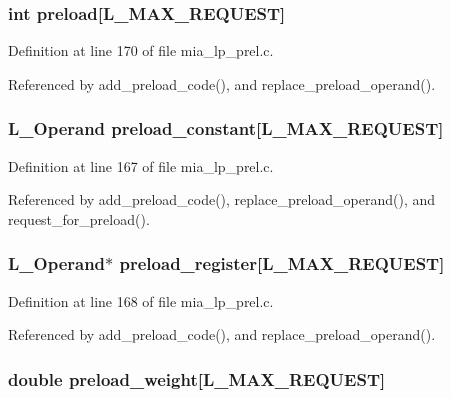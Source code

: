 \subsubsection{\setlength{\rightskip}{0pt plus 5cm}int \bf{preload}[L\_\-MAX\_\-REQUEST]\hspace{0.3cm}{\tt  [static]}}\label{mia__lp__prel_8c_c0e0a3d5ef59f3fb14c50d1c6f427555}




Definition at line 170 of file mia\_\-lp\_\-prel.c.

Referenced by add\_\-preload\_\-code(), and replace\_\-preload\_\-operand().
\subsubsection{\setlength{\rightskip}{0pt plus 5cm}L\_\-Operand \bf{preload\_\-constant}[L\_\-MAX\_\-REQUEST]\hspace{0.3cm}{\tt  [static]}}\label{mia__lp__prel_8c_55cf12a2bcb4d565835bc04cac373988}




Definition at line 167 of file mia\_\-lp\_\-prel.c.

Referenced by add\_\-preload\_\-code(), replace\_\-preload\_\-operand(), and request\_\-for\_\-preload().
\subsubsection{\setlength{\rightskip}{0pt plus 5cm}L\_\-Operand$\ast$ \bf{preload\_\-register}[L\_\-MAX\_\-REQUEST]\hspace{0.3cm}{\tt  [static]}}\label{mia__lp__prel_8c_0d335db781bd550c382dbc3b90d378cb}




Definition at line 168 of file mia\_\-lp\_\-prel.c.

Referenced by add\_\-preload\_\-code(), and replace\_\-preload\_\-operand().
\subsubsection{\setlength{\rightskip}{0pt plus 5cm}double \bf{preload\_\-weight}[L\_\-MAX\_\-REQUEST]\hspace{0.3cm}{\tt  [static]}}\label{mia__lp__prel_8c_efd9a311b6f65396d2bbdfd427a623c7}




